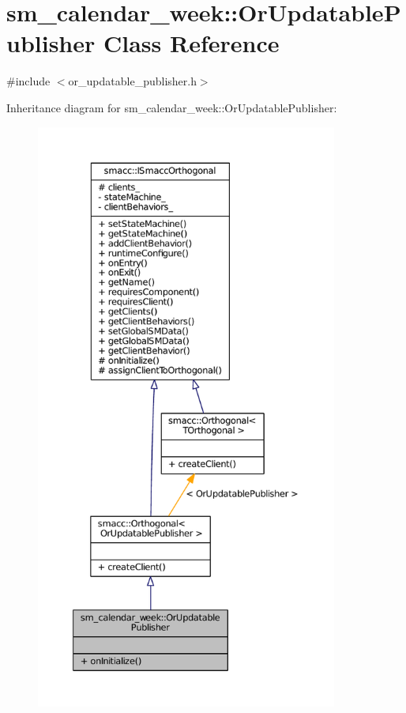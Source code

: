 \hypertarget{classsm__calendar__week_1_1OrUpdatablePublisher}{}\section{sm\+\_\+calendar\+\_\+week\+:\+:Or\+Updatable\+Publisher Class Reference}
\label{classsm__calendar__week_1_1OrUpdatablePublisher}


{\ttfamily \#include $<$or\+\_\+updatable\+\_\+publisher.\+h$>$}



Inheritance diagram for sm\+\_\+calendar\+\_\+week\+:\+:Or\+Updatable\+Publisher\+:
\nopagebreak
\begin{figure}[H]
\begin{center}
\leavevmode
\includegraphics[height=550pt]{classsm__calendar__week_1_1OrUpdatablePublisher__inherit__graph}
\end{center}
\end{figure}


